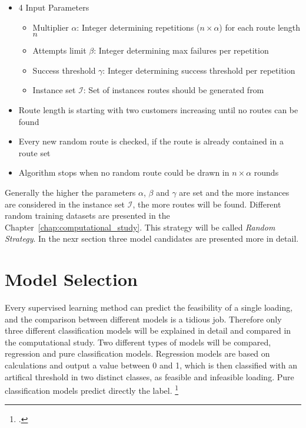 \begin{itemize}
    \item 4 Input Parameters
          \begin{itemize}
              \item Multiplier $\alpha$: Integer determining repetitions ($n\times\alpha$) for each route length $n$
              \item  Attempts limit $\beta$: Integer determining max failures per repetition
              \item  Success threshold $\gamma$: Integer determining success threshold per repetition
              \item Instance set $\mathcal{I}$: Set of instances routes should be generated from
          \end{itemize}
    \item Route length is starting with two customers increasing until no routes can be found
    \item Every new random route is checked, if the route is already contained in a route set
    \item Algorithm stops when no random route could be drawn in $n \times \alpha$ rounds
\end{itemize}

Generally the higher the parameters $\alpha$, $\beta$ and $\gamma$ are set and the more instances
are considered in the instance set $\mathcal{I}$, the more routes will be found. Different
random training datasets are presented in the Chapter~\ref{chap:computational_study}.
This strategy will be called \textit{Random Strategy}. In the nexr section three model candidates
are presented more in detail.

\section{Model Selection}
\label{sec:modelselection}
Every supervised learning method can predict the feasibility of a single loading, and the comparison
between different models is a tidious job. Therefore only three different classification
models will be explained in detail and compared in the computational study.
Two different types of models will be compared, regression and pure classification models. Regression
models are based on calculations and output a value between 0 and 1, which is then classified with
an artifical threshold in two distinct classes, as feasible and infeasible loading. Pure classification
models predict directly the label. \footcite[cf.][p.5]{nasteski_overview_2017}

